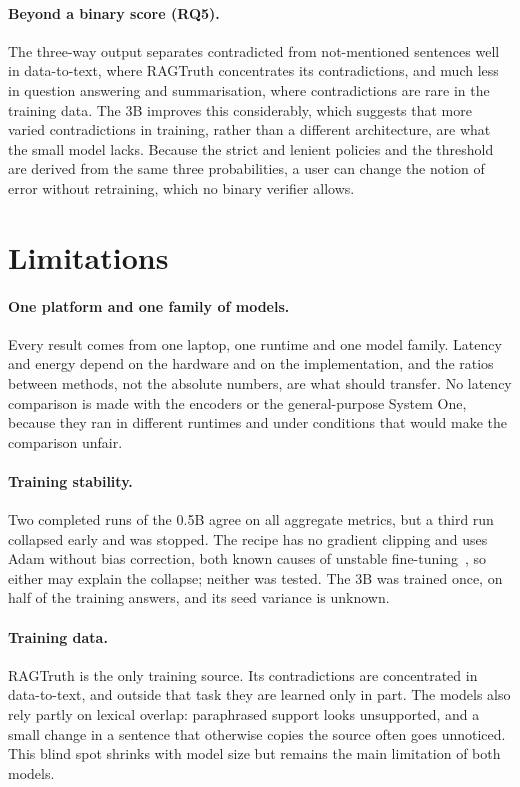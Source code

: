 \paragraph{Beyond a binary score (RQ5).} The three-way output separates contradicted from not-mentioned sentences well
in data-to-text, where RAGTruth concentrates its contradictions, and much less in question answering and summarisation,
where contradictions are rare in the training data. The 3B improves this considerably, which suggests that more varied
contradictions in training, rather than a different architecture, are what the small model lacks. Because the strict and
lenient policies and the threshold are derived from the same three probabilities, a user can change the notion of error
without retraining, which no binary verifier allows.

\section{Limitations}
\label{sec:disc-limitations}

\paragraph{One platform and one family of models.} Every result comes from one laptop, one runtime and one model
family. Latency and energy depend on the hardware and on the implementation, and the ratios between methods, not the
absolute numbers, are what should transfer. No latency comparison is made with the encoders or the general-purpose System
One, because they ran in different runtimes and under conditions that would make the comparison unfair.

\paragraph{Training stability.} Two completed runs of the 0.5B agree on all aggregate metrics, but a third run collapsed
early and was stopped. The recipe has no gradient clipping and uses Adam without bias correction, both known causes of
unstable fine-tuning~\cite{pascanu2013difficulty,mosbach2021stability}, so either may explain the collapse; neither was
tested. The 3B was trained once, on half of the training answers, and its seed variance is unknown.

\paragraph{Training data.} RAGTruth is the only training source. Its contradictions are concentrated in data-to-text,
and outside that task they are learned only in part. The models also rely partly on lexical overlap: paraphrased support
looks unsupported, and a small change in a sentence that otherwise copies the source often goes unnoticed. This blind
spot shrinks with model size but remains the main limitation of both models.

